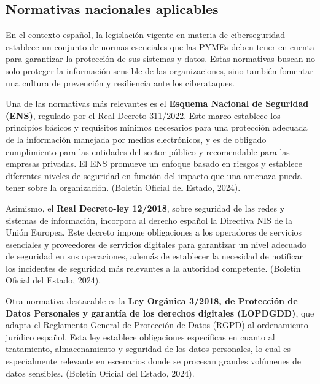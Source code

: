 \documentclass[a4paper, 10pt]{article}
\begin{document}
\subsection{Normativas nacionales aplicables}

    En el contexto español, la legislación vigente en materia de ciberseguridad establece un conjunto de normas esenciales que las PYMEs deben tener en cuenta para garantizar la protección de sus sistemas y datos. Estas normativas buscan no solo proteger la información sensible de las organizaciones, sino también fomentar una cultura de prevención y resiliencia ante los ciberataques.
    \par\vspace{0.5cm}

    Una de las normativas más relevantes es el \textbf{Esquema Nacional de Seguridad (ENS)}, regulado por el Real Decreto 311/2022. Este marco establece los principios básicos y requisitos mínimos necesarios para una protección adecuada de la información manejada por medios electrónicos, y es de obligado cumplimiento para las entidades del sector público y recomendable para las empresas privadas. El ENS promueve un enfoque basado en riesgos y establece diferentes niveles de seguridad en función del impacto que una amenaza pueda tener sobre la organización. (Boletín Oficial del Estado, 2024). \cite{boe}
    \par\vspace{0.5cm}

    Asimismo, el \textbf{Real Decreto-ley 12/2018}, sobre seguridad de las redes y sistemas de información, incorpora al derecho español la Directiva NIS de la Unión Europea. Este decreto impone obligaciones a los operadores de servicios esenciales y proveedores de servicios digitales para garantizar un nivel adecuado de seguridad en sus operaciones, además de establecer la necesidad de notificar los incidentes de seguridad más relevantes a la autoridad competente. (Boletín Oficial del Estado, 2024). \cite{boe}
    \par\vspace{0.5cm}

    Otra normativa destacable es la \textbf{Ley Orgánica 3/2018, de Protección de Datos Personales y garantía de los derechos digitales (LOPDGDD)}, que adapta el Reglamento General de Protección de Datos (RGPD) al ordenamiento jurídico español. Esta ley establece obligaciones específicas en cuanto al tratamiento, almacenamiento y seguridad de los datos personales, lo cual es especialmente relevante en escenarios donde se procesan grandes volúmenes de datos sensibles. (Boletín Oficial del Estado, 2024). \cite{boe}
    \par\vspace{0.5cm}
\end{document}
